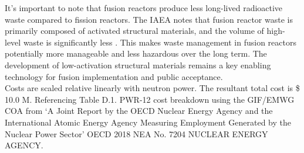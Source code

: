 It's important to note that fusion reactors produce less long-lived radioactive waste compared to fission reactors. The IAEA notes that fusion reactor waste is primarily composed of activated structural materials, and the volume of high-level waste is significantly less \cite{girard2008summary}. This makes waste management in fusion reactors potentially more manageable and less hazardous over the long term. The development of low-activation structural materials remains a key enabling technology for fusion implementation and public acceptance.\\

Costs are scaled relative linearly with neutron power. The resultant total cost is \$ 10.0 M. Referencing Table D.1. PWR-12 cost breakdown using the GIF/EMWG COA from `A Joint Report by the OECD Nuclear Energy Agency and the International Atomic Energy Agency Measuring Employment Generated by the Nuclear Power Sector'  OECD 2018 NEA No. 7204 NUCLEAR ENERGY AGENCY.
